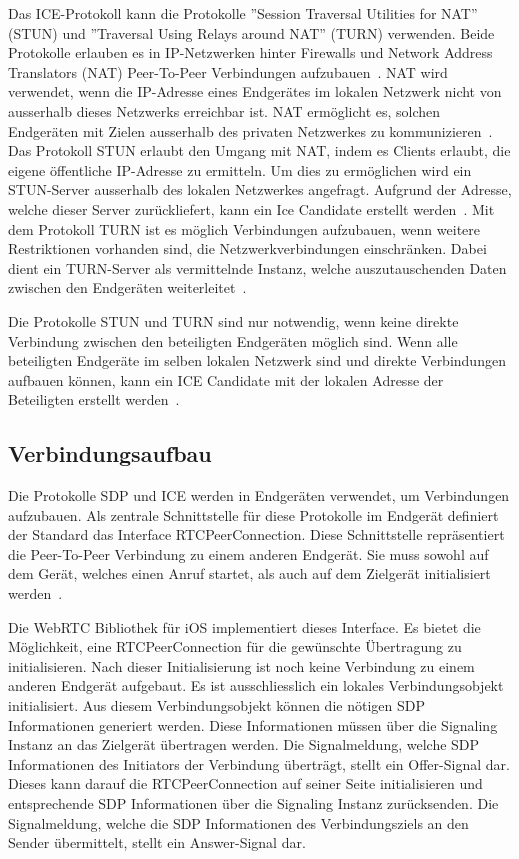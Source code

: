 Das ICE-Protokoll kann die Protokolle ''Session Traversal Utilities for NAT'' (STUN) und ''Traversal Using Relays around NAT'' (TURN) verwenden.
Beide Protokolle erlauben es in IP-Netzwerken hinter Firewalls und Network Address Translators (NAT) Peer-To-Peer Verbindungen aufzubauen~\cite{rfc_8445_ice}.
NAT wird verwendet, wenn die IP-Adresse eines Endgerätes im lokalen Netzwerk nicht von ausserhalb dieses Netzwerks erreichbar ist.
NAT ermöglicht es, solchen Endgeräten mit Zielen ausserhalb des privaten Netzwerkes zu kommunizieren~\cite{rfc_2663_nat}.
Das Protokoll STUN erlaubt den Umgang mit NAT, indem es Clients erlaubt, die eigene öffentliche IP-Adresse zu ermitteln.
Um dies zu ermöglichen wird ein STUN-Server ausserhalb des lokalen Netzwerkes angefragt.
Aufgrund der Adresse, welche dieser Server zurückliefert, kann ein Ice Candidate erstellt werden~\cite{rfc_8445_ice}.
Mit dem Protokoll TURN ist es möglich Verbindungen aufzubauen, wenn weitere Restriktionen vorhanden sind, die Netzwerkverbindungen einschränken.
Dabei dient ein TURN-Server als vermittelnde Instanz, welche auszutauschenden Daten zwischen den Endgeräten weiterleitet~\cite{webRTC_TURN}.

Die Protokolle STUN und TURN sind nur notwendig, wenn keine direkte Verbindung zwischen den beteiligten Endgeräten möglich sind.
Wenn alle beteiligten Endgeräte im selben lokalen Netzwerk sind und direkte Verbindungen aufbauen können, kann ein ICE Candidate mit der lokalen Adresse der Beteiligten erstellt werden~\cite{webRTC_TURN}.

\subsection{Verbindungsaufbau}

Die Protokolle SDP und ICE werden in Endgeräten verwendet, um Verbindungen aufzubauen.
Als zentrale Schnittstelle für diese Protokolle im Endgerät definiert der Standard das Interface RTCPeerConnection.
Diese Schnittstelle repräsentiert die Peer-To-Peer Verbindung zu einem anderen Endgerät.
Sie muss sowohl auf dem Gerät, welches einen Anruf startet, als auch auf dem Zielgerät initialisiert werden~\cite{webrtc_spec}.

Die WebRTC Bibliothek für iOS implementiert dieses Interface.
Es bietet die Möglichkeit, eine RTCPeerConnection für die gewünschte Übertragung zu initialisieren.
Nach dieser Initialisierung ist noch keine Verbindung zu einem anderen Endgerät aufgebaut.
Es ist ausschliesslich ein lokales Verbindungsobjekt initialisiert.
Aus diesem Verbindungsobjekt können die nötigen SDP Informationen generiert werden.
Diese Informationen müssen über die Signaling Instanz an das Zielgerät übertragen werden.
Die Signalmeldung, welche SDP Informationen des Initiators der Verbindung überträgt, stellt ein Offer-Signal dar.
Dieses kann darauf die RTCPeerConnection auf seiner Seite initialisieren und entsprechende SDP Informationen über die Signaling Instanz zurücksenden.
Die Signalmeldung, welche die SDP Informationen des Verbindungsziels an den Sender übermittelt, stellt ein Answer-Signal dar.

